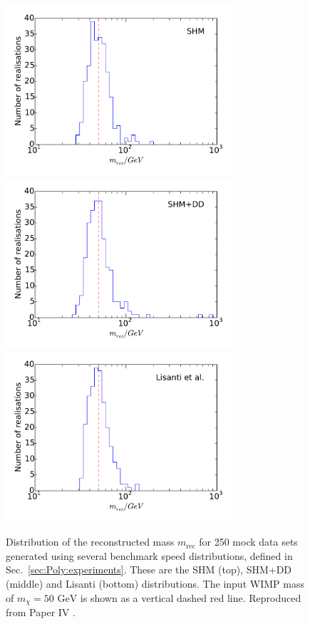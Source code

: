 \begin{figure}
\centering
  \includegraphics[trim=0cm 1cm 0cm 0.5cm,clip=true,width=0.75\textwidth]{Poly/SHM_ensemble.pdf}
  \includegraphics[trim=0cm 1cm 0cm 0.5cm,clip=true,width=0.75\textwidth]{Poly/DD_ensemble.pdf}
  \includegraphics[trim=0cm 1cm 0cm 0.5cm,clip=true,width=0.75\textwidth]{Poly/LIS_ensemble.pdf}
  \caption[Distribution of the reconstructed mass using a 50 GeV WIMP and SHM, SHM+DD and Lisanti \etal distribution functions]{Distribution of the reconstructed mass $m_\textrm{rec}$ for 250 mock data sets generated using several benchmark speed distributions, defined in Sec.~\ref{sec:Poly:experiments}. These are the SHM (top), SHM+DD (middle) and Lisanti \etal (bottom) distributions. The input WIMP mass of $m_\chi = 50 \textrm{ GeV}$ is shown as a vertical dashed red line. Reproduced from Paper IV \cite{Kavanagh:2014}.} 
  \label{fig:Poly:Realisations}
\end{figure}

